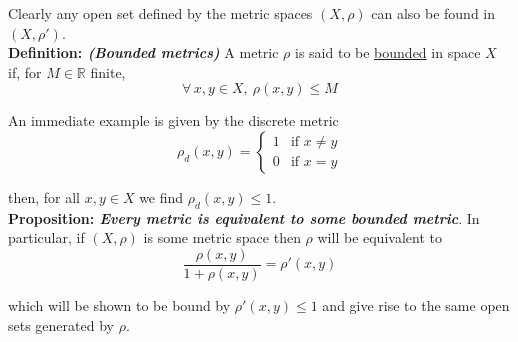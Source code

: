 \documentclass[12pt]{article}
\newcommand{\R}{\mathbb R}
\begin{document}
Clearly any open set defined by the metric spaces $(X, \rho)$ can also be found in $(X, \rho')$. \\

%
%
{\bf Definition: {\em (Bounded metrics)}} A metric $\rho$ is said to be \underline{bounded} in space $X$ if, for $M \in \R$ finite,
\begin{equation*}
	\forall\,x,y\in X,~\rho(x,y) \leq M
\end{equation*}


An immediate example is given by the discrete metric
\begin{equation*}
	\rho_d(x,y) = 
	\begin{cases}
		1 & \text{if } x \neq y \\
		0 & \text{if } x = y
	\end{cases}
\end{equation*}

then, for all $x,y \in X$ we find $\rho_d(x,y) \leq 1$. \\

%
%
{\bf Proposition: {\em Every metric is equivalent to some bounded metric}}. In particular, if $(X, \rho)$ is some metric space then $\rho$ will be equivalent to 
\begin{equation*}
	\frac{\rho(x,y)}{1 + \rho(x,y)} = \rho'(x,y)
\end{equation*}

which will be shown to be bound by $\rho'(x,y) \leq 1$ and give rise to the same open sets generated by $\rho$.
\end{document}
